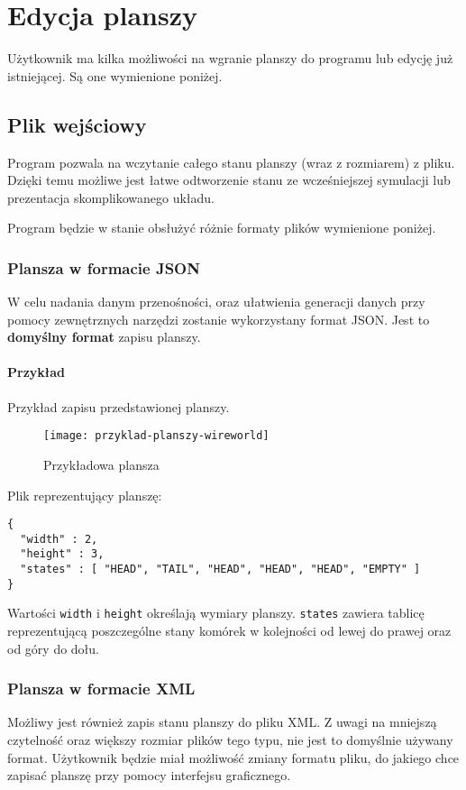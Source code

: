 \documentclass{report}
\begin{document}
\chapter{Edycja planszy}
Użytkownik ma kilka możliwości na wgranie planszy do programu lub edycję już istniejącej. Są one wymienione poniżej.

\section{Plik wejściowy}  \label{format}
Program pozwala na wczytanie całego stanu planszy (wraz z rozmiarem) z pliku. Dzięki temu możliwe jest łatwe odtworzenie stanu ze wcześniejszej symulacji lub prezentacja skomplikowanego układu.

Program będzie w stanie obsłużyć różnie formaty plików wymienione poniżej.

\subsection{Plansza w formacie JSON}
W celu nadania danym przenośności, oraz ułatwienia generacji danych przy pomocy zewnętrznych narzędzi zostanie wykorzystany format JSON. Jest to \textbf{domyślny format} zapisu planszy.

\subsubsection{Przykład}
Przykład zapisu przedstawionej planszy. 

\begin{figure}[H]
    \centering
    \texttt{[image: przyklad-planszy-wireworld]}
    \caption{Przykładowa plansza}
\end{figure}

\noindent{}Plik reprezentujący planszę:
\begin{verbatim}
{
  "width" : 2,
  "height" : 3,
  "states" : [ "HEAD", "TAIL", "HEAD", "HEAD", "HEAD", "EMPTY" ]
}
\end{verbatim}

Wartości \texttt{width} i \texttt{height} określają wymiary planszy.
\texttt{states} zawiera tablicę reprezentującą poszczególne stany komórek w kolejności od lewej do prawej oraz od góry do dołu. 

\subsection{Plansza w formacie XML}
Możliwy jest również zapis stanu planszy do pliku XML. Z uwagi na mniejszą czytelność oraz większy rozmiar plików tego typu, nie jest to domyślnie używany format. Użytkownik będzie miał możliwość zmiany formatu pliku, do jakiego chce zapisać planszę przy pomocy interfejsu graficznego.
\end{document}
